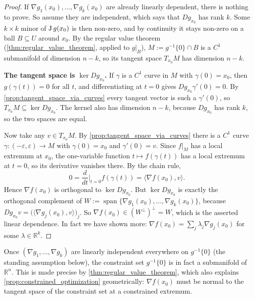 \begin{proof}
If $\nabla g_1(x_0),\dots,\nabla g_k(x_0)$ are already linearly dependent, there is nothing to
prove. So assume they are independent, which says that $Dg_{x_0}$ has rank $k$. Some $k\times k$
minor of $\operatorname{J} g(x_0)$ is then non-zero, and by continuity it stays non-zero on a ball
$B \subseteq U$ around $x_0$. By the regular value theorem (\cref{thm:regular_value_theorem},
applied to $g|_B$), $M := g^{-1}\{0\} \cap B$ is a $C^1$ submanifold of dimension $n-k$, so its
tangent space $T_{x_0}M$ has dimension $n-k$.

\textbf{The tangent space is $\ker Dg_{x_0}$.} If $\gamma$ is a $C^1$ curve in $M$ with
$\gamma(0) = x_0$, then $g(\gamma(t)) = 0$ for all $t$, and differentiating at $t=0$ gives
$Dg_{x_0}\gamma'(0) = 0$. By \cref{prop:tangent_space_via_curves} every tangent vector is such a
$\gamma'(0)$, so $T_{x_0}M \subseteq \ker Dg_{x_0}$. The kernel also has dimension $n-k$, because
$Dg_{x_0}$ has rank $k$, so the two spaces are equal.

Now take any $v \in T_{x_0}M$. By \cref{prop:tangent_space_via_curves} there is a $C^1$ curve
$\gamma : (-\varepsilon,\varepsilon) \to M$ with $\gamma(0) = x_0$ and $\gamma'(0) = v$. Since
$f|_M$ has a local extremum at $x_0$, the one-variable function $t \mapsto f(\gamma(t))$ has a
local extremum at $t = 0$, so its derivative vanishes there. By the chain rule,
\[0 = \frac{d}{dt}\Big|_{t=0} f(\gamma(t)) = \langle \nabla f(x_0), v\rangle .\]
Hence $\nabla f(x_0)$ is orthogonal to $\ker Dg_{x_0}$. But $\ker Dg_{x_0}$ is exactly the
orthogonal complement of $W := \operatorname{span}\{\nabla g_1(x_0),\dots,\nabla g_k(x_0)\}$,
because $Dg_{x_0}v = \big(\langle\nabla g_j(x_0),v\rangle\big)_{j}$. So
$\nabla f(x_0) \in (W^\perp)^\perp = W$, which is the asserted linear dependence. In fact we have
shown more: $\nabla f(x_0) = \sum_j \lambda_j \nabla g_j(x_0)$ for some $\lambda \in \mathbb{R}^k$.
\end{proof}

\begin{remark}
Once $(\nabla g_1,\dots,\nabla g_k)$ are linearly independent everywhere on $g^{-1}\{0\}$ (the
standing assumption below), the constraint set $g^{-1}\{0\}$ is in fact a submanifold of
$\mathbb{R}^n$. This is made precise by \cref{thm:regular_value_theorem}, which also explains
\cref{prop:constrained_optimization} geometrically: $\nabla f(x_0)$ must be normal to the tangent
space of the constraint set at a constrained extremum.
\end{remark}

